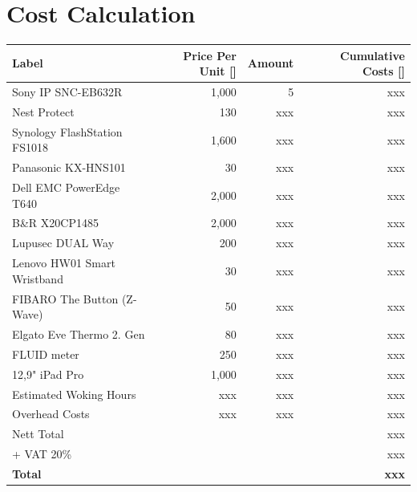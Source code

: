 \section{Cost Calculation}
\begin{table}[h]
	\centering
	\renewcommand{\arraystretch}{1.9}
	\begin{tabular}{lrrr}
	Label & Price Per Unit [\officialeuro] & Amount & Cumulative Costs [\officialeuro] \\
	\hline
	Sony IP SNC-EB632R & 1,000 & 5 & xxx\\
	Nest Protect & 130 & xxx & xxx\\
	Synology FlashStation FS1018 & 1,600 & xxx & xxx\\
	Panasonic KX-HNS101 & 30 & xxx & xxx\\
	Dell EMC PowerEdge T640 & 2,000 & xxx & xxx\\
	B\&R X20CP1485 & 2,000 & xxx & xxx\\
	Lupusec DUAL Way & 200 & xxx & xxx\\
	Lenovo HW01 Smart Wristband & 30 & xxx & xxx\\
	FIBARO The Button (Z-Wave) & 50 & xxx & xxx\\
	Elgato Eve Thermo 2. Gen & 80 & xxx & xxx\\
	FLUID meter & 250 & xxx & xxx\\
	12,9" iPad Pro & 1,000 & xxx & xxx\\
	\hline
	Estimated Woking Hours & xxx & xxx & xxx \\
	Overhead Costs & xxx & xxx & xxx\\
	\hline
	\hline
	Nett Total & & & xxx\\
	+ VAT 20\% & & & xxx\\
	\hline
	\hline
	\textbf{Total} & & & \textbf{xxx}
	\end{tabular}
\end{table}
